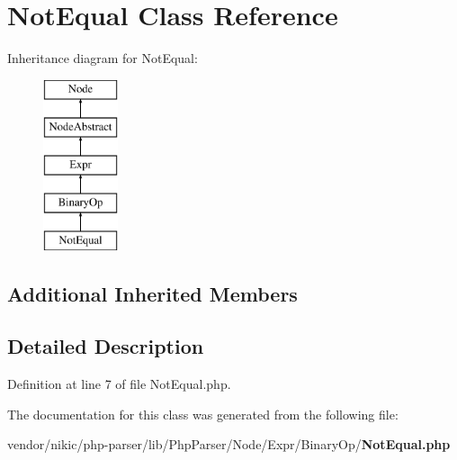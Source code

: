 \section{Not\+Equal Class Reference}
\label{class_php_parser_1_1_node_1_1_expr_1_1_binary_op_1_1_not_equal}
Inheritance diagram for Not\+Equal\+:\begin{figure}[H]
\begin{center}
\leavevmode
\includegraphics[height=5.000000cm]{class_php_parser_1_1_node_1_1_expr_1_1_binary_op_1_1_not_equal}
\end{center}
\end{figure}
\subsection*{Additional Inherited Members}


\subsection{Detailed Description}


Definition at line 7 of file Not\+Equal.\+php.



The documentation for this class was generated from the following file\+:\begin{DoxyCompactItemize}
\item 
vendor/nikic/php-\/parser/lib/\+Php\+Parser/\+Node/\+Expr/\+Binary\+Op/{\bf Not\+Equal.\+php}\end{DoxyCompactItemize}
